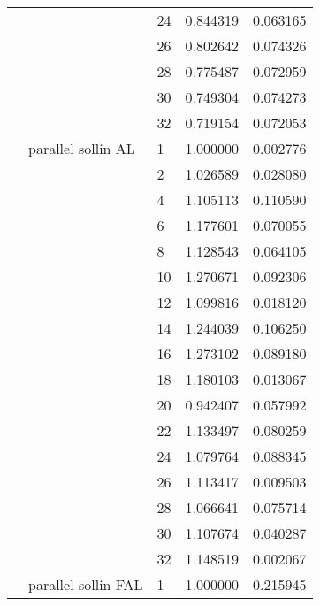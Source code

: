 \begin{tabular}{lllrr}
                      &                     & 24 &  0.844319 &  0.063165 \\
                      &                     & 26 &  0.802642 &  0.074326 \\
                      &                     & 28 &  0.775487 &  0.072959 \\
                      &                     & 30 &  0.749304 &  0.074273 \\
                      &                     & 32 &  0.719154 &  0.072053 \\
                      & parallel sollin AL & 1  &  1.000000 &  0.002776 \\
                      &                     & 2  &  1.026589 &  0.028080 \\
                      &                     & 4  &  1.105113 &  0.110590 \\
                      &                     & 6  &  1.177601 &  0.070055 \\
                      &                     & 8  &  1.128543 &  0.064105 \\
                      &                     & 10 &  1.270671 &  0.092306 \\
                      &                     & 12 &  1.099816 &  0.018120 \\
                      &                     & 14 &  1.244039 &  0.106250 \\
                      &                     & 16 &  1.273102 &  0.089180 \\
                      &                     & 18 &  1.180103 &  0.013067 \\
                      &                     & 20 &  0.942407 &  0.057992 \\
                      &                     & 22 &  1.133497 &  0.080259 \\
                      &                     & 24 &  1.079764 &  0.088345 \\
                      &                     & 26 &  1.113417 &  0.009503 \\
                      &                     & 28 &  1.066641 &  0.075714 \\
                      &                     & 30 &  1.107674 &  0.040287 \\
                      &                     & 32 &  1.148519 &  0.002067 \\
                      & parallel sollin FAL & 1  &  1.000000 &  0.215945 \\

\end{tabular}
